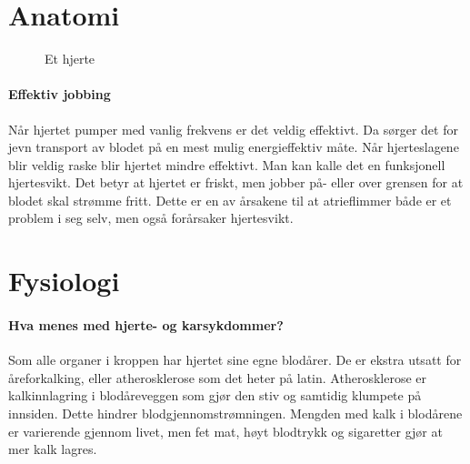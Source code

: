 		\section{Anatomi}
					\begin{figure}[ht]
                      \centering
                      \caption{Et hjerte}
                    \end{figure}    


			\paragraph{Effektiv jobbing\\}
				Når hjertet pumper med vanlig frekvens er det veldig effektivt. Da sørger det for jevn transport av blodet på en mest mulig energieffektiv måte. Når hjerteslagene blir veldig raske blir hjertet mindre effektivt\cite{FA-saladin}. Man kan kalle det en funksjonell hjertesvikt. Det betyr at hjertet er friskt, men jobber på- eller over grensen for at blodet skal strømme fritt. Dette er en av årsakene til at atrieflimmer både er et problem i seg selv, men også forårsaker hjertesvikt.
		\section{Fysiologi}	
			\paragraph{Hva menes med hjerte- og karsykdommer?\\}\label{sec:athero}
				Som alle organer i kroppen har hjertet sine egne blodårer. De er ekstra utsatt for åreforkalking, eller atherosklerose som det heter på latin. Atherosklerose er kalkinnlagring i blodåreveggen som gjør den stiv og samtidig klumpete på innsiden. Dette hindrer blodgjennomstrømningen. Mengden med kalk i blodårene er varierende gjennom livet, men fet mat, høyt blodtrykk og sigaretter gjør at mer kalk lagres. 
